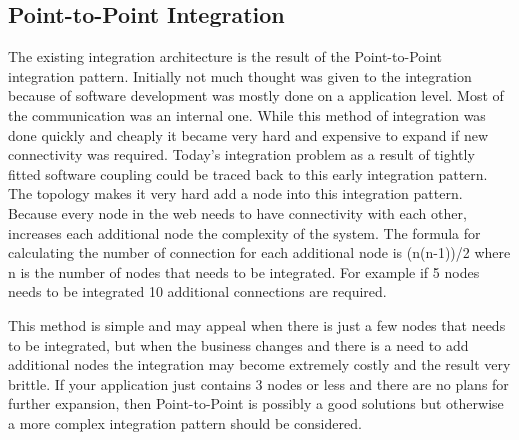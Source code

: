 \documentclass{llncs}
\begin{document}
\subsection{Point-to-Point Integration}
The existing integration architecture is the result of the Point-to-Point integration pattern. Initially not much thought was given to the integration because of software development was mostly done on a application level. Most of the communication was an internal one. While this method of integration was done quickly and cheaply it became very hard and expensive to expand if new connectivity was required. Today's integration problem as a result of tightly fitted software coupling could be traced back to this early integration pattern. The topology makes it very hard add a node into this integration pattern. Because every node in the web needs to have connectivity with each other, increases each additional node the complexity of the system. The  formula for calculating the number of connection for each additional node is (n(n-1))/2 \cite{risimic06} where n is the number of nodes that needs to be integrated. For example if 5 nodes needs to be integrated 10 additional connections are required.

This method is simple and may appeal when there is just a few nodes that needs to be integrated, but when the business changes and there is a need to add additional nodes the integration may become extremely costly and the result very brittle. If your application just contains 3 nodes or less and there are no plans for further expansion, then Point-to-Point is possibly a good solutions but otherwise a more complex integration pattern should be considered.
\end{document}

